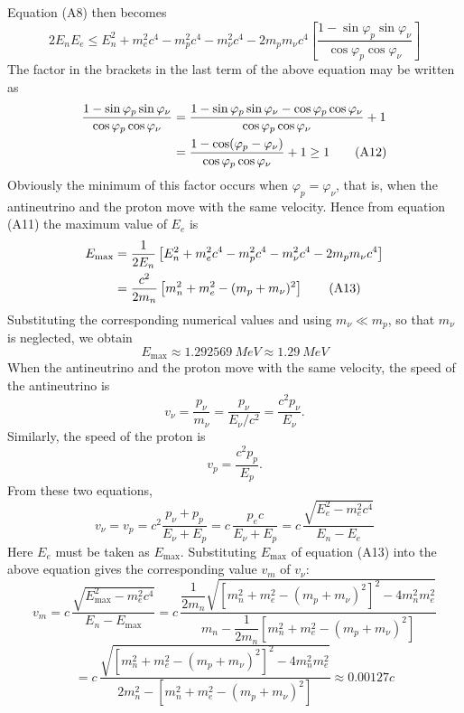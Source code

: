 Equation (A8) then becomes
\begin{equation}
2E_nE_e\le E_n^2+m_e^2c^4-m_p^2c^4-m_\nu^2c^4-2m_pm_\nu c^4\left[\frac{1-\sin\varphi_p\sin\varphi_\nu}{\cos\varphi_p\cos\varphi_\nu}\right] \tag{A11}
\end{equation}
The factor in the brackets in the last term of the above equation may be written as
\begin{align}
\frac{1-\sin\varphi_p\sin\varphi_\nu}{\cos\varphi_p\cos\varphi_\nu}
&= \frac{1-\sin\varphi_p\sin\varphi_\nu-\cos\varphi_p\cos\varphi_\nu}{\cos\varphi_p\cos\varphi_\nu}+1\notag\\
&= \frac{1-\cos(\varphi_p-\varphi_\nu)}{\cos\varphi_p\cos\varphi_\nu}+1\ge1 \tag{A12}
\end{align}
Obviously the minimum of this factor occurs when $\varphi_p=\varphi_\nu$, that is, when the antineutrino and the proton move with the same velocity. Hence from equation (A11) the maximum value of $E_e$ is
\begin{align}
E_{\max} &= \frac{1}{2E_n}\left[E_n^2+m_e^2c^4-m_p^2c^4-m_\nu^2c^4-2m_pm_\nu c^4\right]\notag\\
&= \frac{c^2}{2m_n}\left[m_n^2+m_e^2-(m_p+m_\nu)^2\right] \tag{A13}
\end{align}
Substituting the corresponding numerical values and using $m_\nu\ll m_p$, so that $m_\nu$ is neglected, we obtain
\begin{equation}
E_{\max}\approx\SI{1.292569}{MeV}\approx\SI{1.29}{MeV} \tag{A14}
\end{equation}
When the antineutrino and the proton move with the same velocity, the speed of the antineutrino is
\begin{equation*}
v_\nu=\frac{p_\nu}{m_\nu}=\frac{p_\nu}{E_\nu/c^2}=\frac{c^2p_\nu}{E_\nu}.
\end{equation*}
Similarly, the speed of the proton is
\begin{equation*}
v_p=\frac{c^2p_p}{E_p}.
\end{equation*}
From these two equations,
\begin{equation}
v_\nu=v_p=c^2\frac{p_\nu+p_p}{E_\nu+E_p}=c\,\frac{p_ec}{E_\nu+E_p}=c\,\frac{\sqrt{E_e^2-m_e^2c^4}}{E_n-E_e} \tag{A15}
\end{equation}
Here $E_e$ must be taken as $E_{\max}$. Substituting $E_{\max}$ of equation (A13) into the above equation gives the corresponding value $v_m$ of $v_\nu$:
\begin{equation*}
v_m=c\,\frac{\sqrt{E_{\max}^2-m_e^2c^4}}{E_n-E_{\max}}
=c\,\frac{\dfrac{1}{2m_n}\sqrt{\left[m_n^2+m_e^2-(m_p+m_\nu)^2\right]^2-4m_n^2m_e^2}}{m_n-\dfrac{1}{2m_n}\left[m_n^2+m_e^2-(m_p+m_\nu)^2\right]}
\end{equation*}
\begin{equation}
=c\,\frac{\sqrt{\left[m_n^2+m_e^2-(m_p+m_\nu)^2\right]^2-4m_n^2m_e^2}}{2m_n^2-\left[m_n^2+m_e^2-(m_p+m_\nu)^2\right]}\approx0.00127c \tag{A16}
\end{equation}

